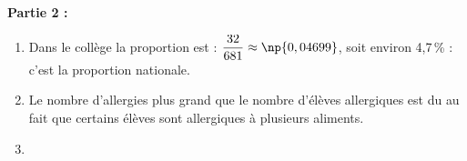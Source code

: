 \medskip

\textbf{Partie 2 :}

\medskip

%
%

\begin{enumerate}
\item %
Dans le collège la proportion est : $\dfrac{32}{681} \approx \np{0,04699}$, soit environ 4,7\,\% : c'est la proportion nationale.
\item %

Le nombre d'allergies plus grand que le nombre d'élèves allergiques est du au fait que certains élèves sont allergiques à plusieurs aliments.
\item %


\end{enumerate}
